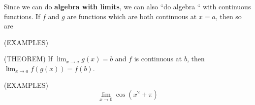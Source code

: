 \documentclass[11pt]{article}
\begin{document}
\pagebreak

Since we can do {\bf algebra with limits}, we can also ``do  algebra `` with continuous functions.  If $f$ and $g$ are
functions which are both continuous at $x=a$, then so are 

\vspace {1.2in}

(EXAMPLES)

\vspace {1.2in}

(THEOREM) If $\lim_{x\to a}g(x)  = b $ and $f$ is continuous at $b$, then  $\lim_{x\to a}f(g(x))  = f(b) $.

\vspace{1.25in}


(EXAMPLES)
  \begin{displaymath}
\lim_{x \to 0}\cos{(x^2 + \pi)}
  \end{displaymath}
\end{document}
